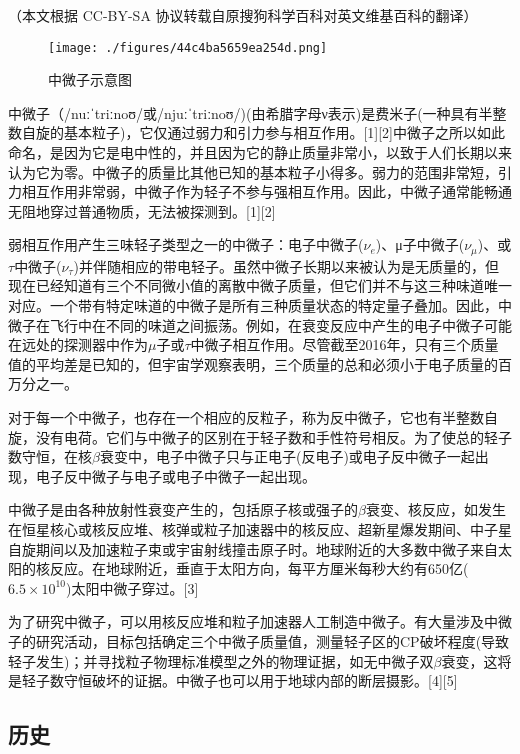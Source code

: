 
（本文根据 CC-BY-SA 协议转载自原搜狗科学百科对英文维基百科的翻译）

\begin{figure}[ht]
\centering
\texttt{[image: ./figures/44c4ba5659ea254d.png]}
\caption{中微子示意图} \label{fig_ZWZ_5}
\end{figure}

中微子（/nuːˈtriːnoʊ/或/njuːˈtriːnoʊ/)(由希腊字母ν表示)是费米子(一种具有半整数自旋的基本粒子)，它仅通过弱力和引力参与相互作用。[1][2]中微子之所以如此命名，是因为它是电中性的，并且因为它的静止质量非常小，以致于人们长期以来认为它为零。中微子的质量比其他已知的基本粒子小得多。弱力的范围非常短，引力相互作用非常弱，中微子作为轻子不参与强相互作用。因此，中微子通常能畅通无阻地穿过普通物质，无法被探测到。[1][2]

弱相互作用产生三味轻子类型之一的中微子：电子中微子($\nu_e$)、μ子中微子($\nu_\mu$)、或$\tau$中微子($\nu_\tau$)并伴随相应的带电轻子。虽然中微子长期以来被认为是无质量的，但现在已经知道有三个不同微小值的离散中微子质量，但它们并不与这三种味道唯一对应。一个带有特定味道的中微子是所有三种质量状态的特定量子叠加。因此，中微子在飞行中在不同的味道之间振荡。例如，在衰变反应中产生的电子中微子可能在远处的探测器中作为$\mu$子或$\tau$中微子相互作用。尽管截至2016年，只有三个质量值的平均差是已知的，但宇宙学观察表明，三个质量的总和必须小于电子质量的百万分之一。

对于每一个中微子，也存在一个相应的反粒子，称为反中微子，它也有半整数自旋，没有电荷。它们与中微子的区别在于轻子数和手性符号相反。为了使总的轻子数守恒，在核$\beta$衰变中，电子中微子只与正电子(反电子)或电子反中微子一起出现，电子反中微子与电子或电子中微子一起出现。

中微子是由各种放射性衰变产生的，包括原子核或强子的$\beta$衰变、核反应，如发生在恒星核心或核反应堆、核弹或粒子加速器中的核反应、超新星爆发期间、中子星自旋期间以及加速粒子束或宇宙射线撞击原子时。地球附近的大多数中微子来自太阳的核反应。在地球附近，垂直于太阳方向，每平方厘米每秒大约有650亿($6.5\times10^{10}$)太阳中微子穿过。[3]

为了研究中微子，可以用核反应堆和粒子加速器人工制造中微子。有大量涉及中微子的研究活动，目标包括确定三个中微子质量值，测量轻子区的CP破坏程度(导致轻子发生)；并寻找粒子物理标准模型之外的物理证据，如无中微子双$\beta$衰变，这将是轻子数守恒破坏的证据。中微子也可以用于地球内部的断层摄影。[4][5]

\subsection{历史}
